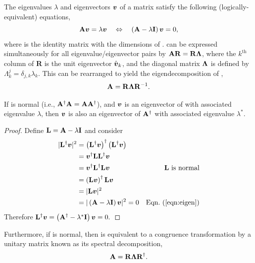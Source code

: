 %
The eigenvalues $\lambda$ and eigenvectors $\mbox{\boldmath $v$}$ of
a matrix  satisfy the following (logically-equivalent) equations,
%
\begin{equation}
    \label{eqn:eigen}
    {\bf A}\mbox{\boldmath $v$} = \lambda\mbox{\boldmath $v$} \quad \Leftrightarrow \quad
    \left({\bf A} - \lambda{\bf I} \right) \mbox{\boldmath $v$} = 0,
\end{equation}
where  is the identity matrix with the dimensions of .
%
 can be expressed simultaneously for all eigenvalue/eigenvector pairs by ${\bf A} {\bf R} = {\bf R} \mbox{\boldmath $\Lambda$}$, where the $k^\mathrm{th}$
column of {\bf{R}} is the unit eigenvector $\hat{\mbox{\boldmath $v$}}_k$, and the diagonal matrix $\mbox{\boldmath $\Lambda$}$ is defined by $\Lambda_k^j = \delta_{j,k} \lambda_k$.
%
This can be rearranged to yield the eigendecomposition of ,
%
\begin{equation}
{\bf A} = {\bf R} \mbox{\boldmath $\Lambda$} {\bf R}^{-1} \label{eqn:eigendecomposition}.
\end{equation}

If  is normal (i.e., ${\bf A}^\dagger{\bf A}={\bf A}{\bf A}^\dagger$),
and $\mbox{\boldmath $v$}$ is an eigenvector of  with associated eigenvalue $\lambda$, 
then $\mbox{\boldmath $v$}$ is also an eigenvector of ${\bf A}^\dagger$ with associated eigenvalue $\lambda^*$.

\begin{proof}
\label{proof:normal_eigenvalue}
Define ${\bf L}={\bf A} - \lambda{\bf I}$ and consider
\begin{align*}
|\JM{L}^\dagger \Jcol{v}|^2
  &= \left( \JM{L}^\dagger \Jcol{v} \right)^\dagger \left( \JM{L}^\dagger \Jcol{v} \right) \\
  &= \Jcol{v}^\dagger \JM{L} \JM{L}^\dagger \Jcol{v} \\
  &= \Jcol{v}^\dagger \JM{L}^\dagger \JM{L} \Jcol{v} & \text{\JM{L} is normal} \\
  &= \left( \JM{L}\Jcol{v} \right)^\dagger \JM{L} \Jcol{v} \\
  &= |\JM{L} \Jcol{v}|^2 \\
  &= |\left(\JM{A} - \lambda\JM{I} \right) \Jcol{v}|^2 = 0 & \peqn{eigen}
\end{align*}
Therefore ${\bf L}^\dagger \mbox{\boldmath $v$} = \left({\bf A}^\dagger - \lambda^*{\bf I} \right) \mbox{\boldmath $v$} = 0.$
\end{proof}
\noindent
Furthermore, if  is normal, then  is equivalent to a
congruence transformation by a unitary matrix known as its spectral decomposition,
%
\begin{equation}
\label{eqn:congruence_eigendecomposition}
{\bf A} = {\bf R} \mbox{\boldmath $\Lambda$} {\bf R}^\dagger.
\end{equation}
%

